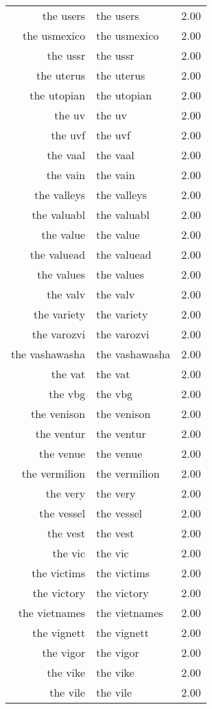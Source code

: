 \begin{table}[ht]
\begin{tabular}{rlr}
  the users & the users & 2.00 \\ 
  the usmexico & the usmexico & 2.00 \\ 
  the ussr & the ussr & 2.00 \\ 
  the uterus & the uterus & 2.00 \\ 
  the utopian & the utopian & 2.00 \\ 
  the uv & the uv & 2.00 \\ 
  the uvf & the uvf & 2.00 \\ 
  the vaal & the vaal & 2.00 \\ 
  the vain & the vain & 2.00 \\ 
  the valleys & the valleys & 2.00 \\ 
  the valuabl & the valuabl & 2.00 \\ 
  the value & the value & 2.00 \\ 
  the valuead & the valuead & 2.00 \\ 
  the values & the values & 2.00 \\ 
  the valv & the valv & 2.00 \\ 
  the variety & the variety & 2.00 \\ 
  the varozvi & the varozvi & 2.00 \\ 
  the vashawasha & the vashawasha & 2.00 \\ 
  the vat & the vat & 2.00 \\ 
  the vbg & the vbg & 2.00 \\ 
  the venison & the venison & 2.00 \\ 
  the ventur & the ventur & 2.00 \\ 
  the venue & the venue & 2.00 \\ 
  the vermilion & the vermilion & 2.00 \\ 
  the very & the very & 2.00 \\ 
  the vessel & the vessel & 2.00 \\ 
  the vest & the vest & 2.00 \\ 
  the vic & the vic & 2.00 \\ 
  the victims & the victims & 2.00 \\ 
  the victory & the victory & 2.00 \\ 
  the vietnames & the vietnames & 2.00 \\ 
  the vignett & the vignett & 2.00 \\ 
  the vigor & the vigor & 2.00 \\ 
  the vike & the vike & 2.00 \\ 
  the vile & the vile & 2.00 \\ 

\end{tabular}
\end{table}

